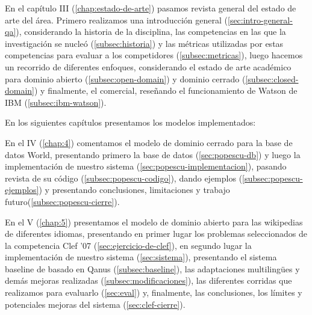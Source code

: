 En el capítulo III (\ref{chap:estado-de-arte}) pasamos revista general del estado de arte del área. Primero realizamos una introducción general (\ref{sec:intro-general-qa}), considerando la historia de la disciplina, las competencias en las que la investigación se nucleó (\ref{subsec:historia}) y las métricas utilizadas por estas competencias para evaluar a los competidores (\ref{subsec:metricas}), luego hacemos un recorrido de diferentes enfoques, considerando el estado de arte académico para dominio abierto (\ref{subsec:open-domain}) y dominio cerrado (\ref{subsec:closed-domain}) y finalmente, el comercial, reseñando el funcionamiento de Watson de IBM (\ref{subsec:ibm-watson}).

En los siguientes capítulos presentamos los modelos implementados:

En el IV (\ref{chap:4}) comentamos el modelo de dominio cerrado para la base de datos World, presentando primero la base de datos (\ref{sec:popescu-db}) y luego la implementación de nuestro sistema (\ref{sec:popescu-implementacion}), pasando revista de su código (\ref{subsec:popescu-codigo}), dando ejemplos (\ref{subsec:popescu-ejemplos}) y presentando conclusiones, limitaciones y trabajo futuro(\ref{subsec:popescu-cierre}).

En el V (\ref{chap:5}) presentamos el modelo de dominio abierto para las wikipedias de diferentes idiomas, presentando en primer lugar los problemas seleccionados de la competencia Clef '07 (\ref{sec:ejercicio-de-clef}), en segundo lugar la implementación de nuestro sistema (\ref{sec:sistema}), presentando el sistema baseline de basado en Qanus (\ref{subsec:baseline}), las adaptaciones multilingües y demás mejoras realizadas (\ref{subsec:modificaciones}), las diferentes corridas que realizamos para evaluarlo (\ref{sec:eval}) y, finalmente, las conclusiones, los límites y potenciales mejoras del sistema (\ref{sec:clef-cierre}).
